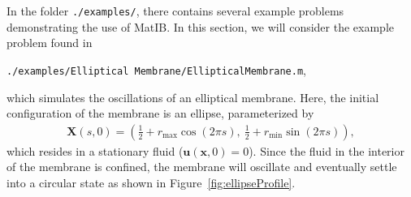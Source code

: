 \documentclass{article}
\newcommand{\mycode}[1]{\texttt{#1}}
\newcommand{\bs}[1]{\boldsymbol{#1}}
\newcommand{\half}{\frac{1}{2}}
\begin{document}
In the folder \mycode{./examples/}, there contains several example problems demonstrating the use of MatIB.
In this section, we will consider the example problem found in
\begin{center}
\mycode{./examples/Elliptical Membrane/EllipticalMembrane.m}, 
\end{center}
which simulates the oscillations of an elliptical membrane.
Here, the initial configuration of the membrane is an 
ellipse, parameterized by
\begin{gather*}
  \bs{X}(s,0) = \left( \half + r_{\text{max}} \cos(2 \pi s) ,~
    \half + r_{\text{min}}  \sin(2 \pi s) \right),
\end{gather*}
which resides in a stationary fluid ($\bs{u}(\bs{x},0)=0$). 
Since the fluid in the interior of the membrane is confined, 
the membrane will oscillate and eventually settle into a circular state
as shown in Figure~\ref{fig:ellipseProfile}.
\end{document}

